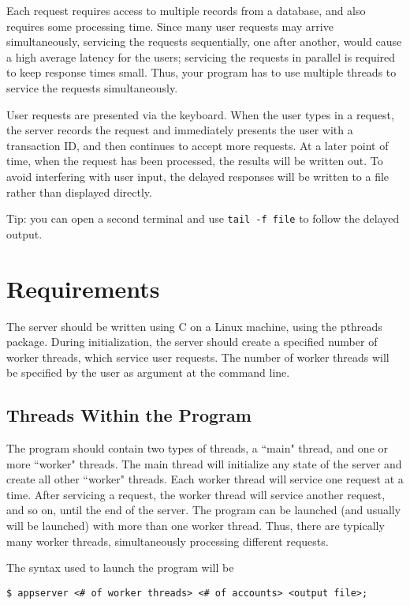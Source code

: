 \documentclass[letterpaper,10pt]{article}
\begin{document}
Each request requires access to multiple records from a database, and also requires some processing
time. Since many user requests may arrive simultaneously, servicing the requests sequentially, one after
another, would cause a high average latency for the users; servicing the requests in parallel is required
to keep response times small. Thus, your program has to use multiple threads to service the requests
simultaneously.

User requests are presented via the keyboard. When the user types in a request, the server records
the request and immediately presents the user with a transaction ID, and then continues to accept more
requests. At a later point of time, when the request has been processed, the results will be written out.
To avoid interfering with user input, the delayed responses will be written to a file rather than displayed
directly.

Tip: you can open a second terminal and use \verb+tail -f file+ to follow the delayed output.


\section{Requirements}
The server should be written using C on a Linux machine, using the pthreads package. During initialization,
the server should create a specified number of worker threads, which service user requests. The number
of worker threads will be specified by the user as argument at the command line.

\subsection{Threads Within the Program}
The program should contain two types of threads, a ``main" thread, and one or more ``worker" threads. The
main thread will initialize any state of the server and create all other ``worker" threads.
Each worker thread
will service one request at a time. After servicing a request, the worker thread will service another request,
and so on, until the end of the server. The program can be launched (and usually will be launched) with
more than one worker thread. Thus, there are typically many worker threads, simultaneously processing
different requests.

The syntax used to launch the program will be

\begin{verbatim}
$ appserver <# of worker threads> <# of accounts> <output file>;
\end{verbatim}
\end{document}

